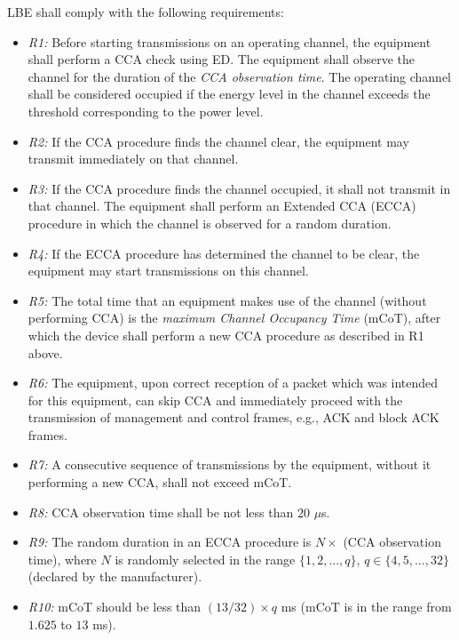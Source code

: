 \documentclass[journal,draftclsnofoot,12pt,onecolumn]{IEEEtran}
\begin{document}
LBE shall comply with the following requirements:

\begin{itemize}

\item
\textit{R1:} Before starting transmissions on an operating channel, the equipment shall perform a CCA check using ED. The equipment shall observe the channel for the duration of the \textit{CCA observation time}. The operating channel shall be considered occupied if the energy level in the channel exceeds the threshold corresponding to the power level.

\item
\textit{R2:}
If the CCA procedure finds the channel clear, the equipment may transmit immediately on that channel.

\item
\textit{R3:}
If the CCA procedure finds the channel occupied, it shall not transmit in that channel. The equipment shall perform an Extended CCA (ECCA) procedure in which the channel is observed for a random duration.

\item
\textit{R4:}
If the ECCA procedure has determined the channel to be clear, the equipment may start transmissions on this channel.

\item
\textit{R5:}
The total time that an equipment makes use of the channel (without performing CCA) is the \textit{maximum Channel Occupancy Time} (mCoT), after which the device shall perform a new CCA procedure as described in R1 above.

\item
\textit{R6:}
The equipment, upon correct reception of a packet which was intended for this equipment, can skip CCA and immediately proceed with the transmission of management and control frames, e.g., ACK and block ACK frames.

\item
\textit{R7:}
A consecutive sequence of transmissions by the equipment, without it performing a new CCA, shall not exceed mCoT.

\item
\textit{R8:}
CCA observation time shall be not less than $20$ $\mu$s.

\item
\textit{R9:}
The random duration in an ECCA procedure is $N \times$ (CCA observation time), where $N$ is randomly selected in the range $\{1,2,...,q\}$, $q \in \{4,5,...,32\}$ (declared by the manufacturer).

\item
\textit{R10:}
mCoT should be less than $(13/32)\times q$ ms (mCoT is in the range from $1.625$ to $13$ ms).

\end{itemize}
\end{document}
